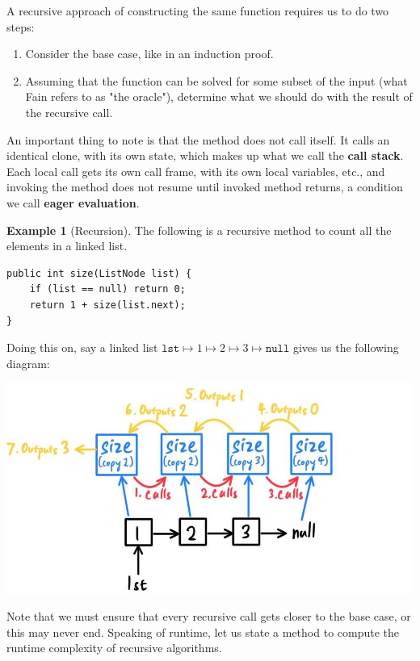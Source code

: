 \documentclass{article}
\theoremstyle{definition}
\newtheorem{example}{Example}[section]
\theoremstyle{remark}
\theoremstyle{definition}
\begin{document}
A recursive approach of constructing the same function requires us to do two steps: 
\begin{enumerate}
    \item Consider the base case, like in an induction proof. 
    \item Assuming that the function can be solved for some subset of the input (what Fain refers to as "the oracle"), determine what we should do with the result of the recursive call. 
\end{enumerate}
An important thing to note is that the method does not call itself. It calls an identical clone, with its own state, which makes up what we call the \textbf{call stack}. Each local call gets its own call frame, with its own local variables, etc., and invoking the method does not resume until invoked method returns, a condition we call \textbf{eager evaluation}. 

\begin{example}[Recursion]
The following is a recursive method to count all the elements in a linked list. 
\begin{verbatim}
public int size(ListNode list) {
    if (list == null) return 0; 
    return 1 + size(list.next); 
}
\end{verbatim}
Doing this on, say a linked list $\texttt{lst} \mapsto 1 \mapsto 2 \mapsto 3 \mapsto \texttt{null}$ gives us the following diagram: 
\begin{center}
    \includegraphics[scale=0.3]{img/size_recursion.jpg}
\end{center}
\end{example}

Note that we must ensure that every recursive call gets closer to the base case, or this may never end. Speaking of runtime, let us state a method to compute the runtime complexity of recursive algorithms. 
\end{document}
